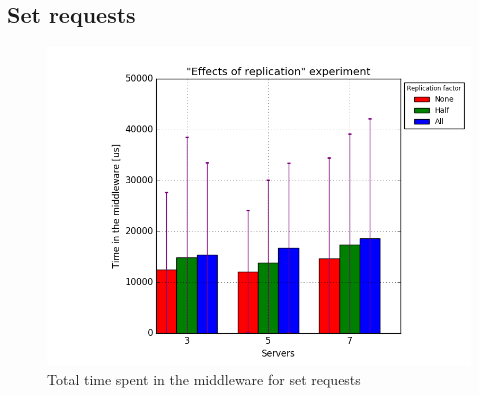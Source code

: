 \documentclass[11pt]{article}
\begin{document}
\subsection{Set requests}
\begin{figure}
\centering
	\includegraphics[width=0.7\linewidth]{plots/replication-set}

\caption{Total time spent in the middleware for set requests}
\label{fig:replication-set}
\end{figure}
\end{document}
